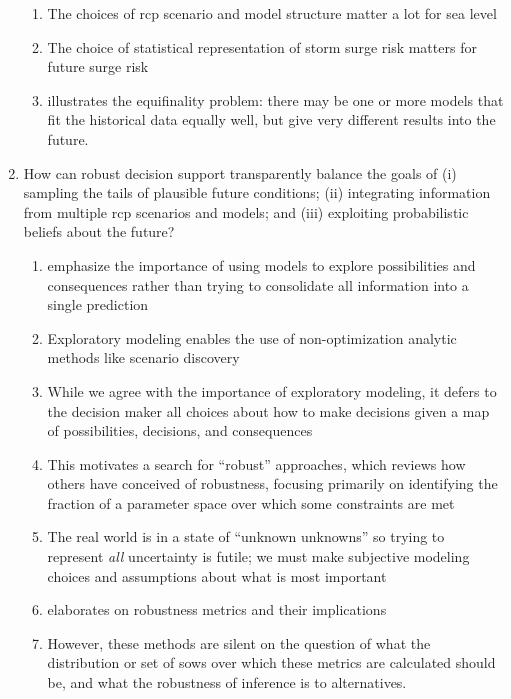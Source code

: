 \documentclass[12pt]{article}
\begin{document}
\begin{enumerate}
\begin{enumerate}
              \item The choices of \gls{rcp} scenario and model structure matter a lot for sea level \citep{kopp_probabilistic:2014,kopp_evolving:2017,wong_brick0.2:2017,ruckert_coastal:2019,wong_nola:2017}
              \item The choice of statistical representation of storm surge risk matters for future surge risk \citep{wong_nola:2017,wong_structural:2020}
              \item \citet{wong_structural:2020} illustrates the equifinality problem: there may be one or more models that fit the historical data equally well, but give very different results into the future.
          \end{enumerate}
    \item How can robust decision support transparently balance the goals of (i) sampling the tails of plausible future conditions; (ii) integrating information from multiple \gls{rcp} scenarios and models; and (iii) exploiting probabilistic beliefs about the future?
          \begin{enumerate}
              \item \citet{bankes:1993,lempert_shaping:2003,Brown:2012kb} emphasize the importance of using models to explore possibilities and consequences rather than trying to consolidate all information into a single prediction
              \item Exploratory modeling enables the use of non-optimization analytic methods like scenario discovery \citep{kwakkel:2019,lamontagne_discovery:2018}
              \item While we agree with the importance of exploratory modeling, it defers to the decision maker all choices about how to make decisions given a map of possibilities, decisions, and consequences
              \item This motivates a search for ``robust'' approaches, which \citet{herman:2015} reviews how others have conceived of robustness, focusing primarily on identifying the fraction of a parameter space over which some constraints are met
              \item The real world is in a state of ``unknown unknowns'' \citep[level 5 as defined in][fig.~1]{walker_deep:2013} so trying to represent \emph{all} uncertainty is futile; we must make subjective modeling choices and assumptions about what is most important
              \item \citet{mcphail_robustness:2019} elaborates on robustness metrics and their implications
              \item However, these methods are silent on the question of what the distribution or set of \glspl{sow} over which these metrics are calculated should be, and what the robustness of inference is to alternatives.
          \end{enumerate}
\end{enumerate}
\end{document}
